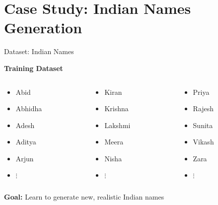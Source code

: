 \documentclass[usenames,dvipsnames]{beamer}
\begin{document}
\section{Case Study: Indian Names Generation}

\begin{frame}{Dataset: Indian Names}
\begin{center}
\textbf{Training Dataset}
\vspace{0.5cm}

\begin{columns}
\begin{column}{0.3\textwidth}
\begin{itemize}
\item Abid
\item Abhidha  
\item Adesh
\item Aditya
\item Arjun
\item $\vdots$
\end{itemize}
\end{column}

\begin{column}{0.3\textwidth}
\begin{itemize}
\item Kiran
\item Krishna
\item Lakshmi
\item Meera
\item Nisha
\item $\vdots$
\end{itemize}
\end{column}

\begin{column}{0.3\textwidth}
\begin{itemize}
\item Priya
\item Rajesh
\item Sunita
\item Vikash
\item Zara
\item $\vdots$
\end{itemize}
\end{column}
\end{columns}

\vspace{1cm}
\textbf{Goal:} Learn to generate new, realistic Indian names
\end{center}
\end{frame}
\end{document}
